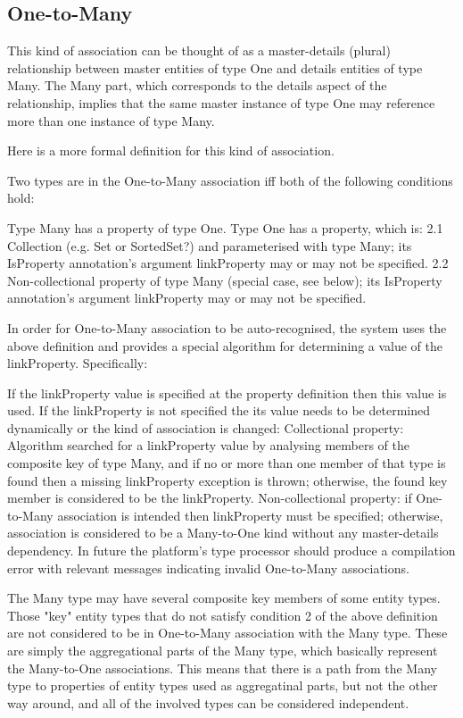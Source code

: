 \subsection{One-to-Many}

  This kind of association can be thought of as a master-details (plural) relationship between master entities of type One and details entities of type Many. The Many part, which corresponds to the details aspect of the relationship, implies that the same master instance of type One may reference more than one instance of type Many.

  Here is a more formal definition for this kind of association.

  Two types are in the One-to-Many association iff both of the following conditions hold:

  Type Many has a property of type One.
  Type One has a property, which is:
    2.1 Collection (e.g. Set or SortedSet?) and parameterised with type Many; its IsProperty annotation's argument linkProperty may or may not be specified.
    2.2 Non-collectional property of type Many (special case, see below); its IsProperty annotation's argument linkProperty may or may not be specified.

  In order for One-to-Many association to be auto-recognised, the system uses the above definition and provides a special algorithm for determining a value of the linkProperty. Specifically:

  If the linkProperty value is specified at the property definition then this value is used.
  If the linkProperty is not specified the its value needs to be determined dynamically or the kind of association is changed:
  Collectional property: Algorithm searched for a linkProperty value by analysing members of the composite key of type Many, and if no or more than one member of that type is found then a missing linkProperty exception is thrown; otherwise, the found key member is considered to be the linkProperty.
  Non-collectional property: if One-to-Many association is intended then linkProperty must be specified; otherwise, association is considered to be a Many-to-One kind without any master-details dependency.
  In future the platform's type processor should produce a compilation error with relevant messages indicating invalid One-to-Many associations.

  The Many type may have several composite key members of some entity types. Those "key" entity types that do not satisfy condition 2 of the above definition are not considered to be in One-to-Many association with the Many type. These are simply the aggregational parts of the Many type, which basically represent the Many-to-One associations. This means that there is a path from the Many type to properties of entity types used as aggregatinal parts, but not the other way around, and all of the involved types can be considered independent.

